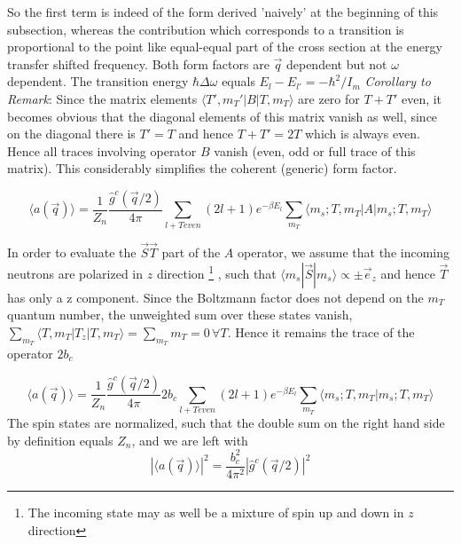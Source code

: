 \documentclass[11pt,a4paper]{article}
\begin{document}
So the first term is indeed of the form derived 'naively' at the beginning of this subsection, whereas the contribution which
corresponds to a transition is proportional to the point like equal-equal part of the cross section at the energy transfer shifted frequency.
Both form factors are $\vec q$ dependent but not $\omega$ dependent. The transition energy $\hbar \Delta \omega$ equals $E_l -E_{l'}
= -\hbar^2/I_m$ \newline
\textit{Corollary to Remark}: Since the matrix elements 
$\langle T', m_T' | B | T, m_T \rangle$ are zero for $T + T'$ even, it becomes obvious that the diagonal elements of this matrix
vanish as well, since on the diagonal there is $T' = T$ and hence $T + T' = 2T$ which is always even. Hence all traces involving operator $B$
vanish (even, odd or full trace of this matrix). This considerably simplifies the coherent (generic) form factor.

\begin{equation}
\langle a (\vec q ) \rangle = 
\frac{ 1 }{Z_n} \frac{ \hat g^c (\vec q /2)}{4 \pi }  \sum_{l + T even} (2l + 1)e^{-\beta E_l} 
\sum_{m_T}
\langle m_s; T, m_T | A | m_s; T, m_T \rangle
\end{equation}

In order to evaluate the $\vec S \vec T$ part of the $A$ operator, we assume that the incoming neutrons are polarized 
in $z$ direction \footnote{The incoming state may as well be a mixture of spin up and down in $z$ direction}
, such that $\langle m_s | \vec S | m_s \rangle \propto \pm \vec e_z$ and hence $\vec T$ has only a z component. Since the
Boltzmann factor does not depend on the $m_T$ quantum number, the unweighted sum over these states vanish, 
$\sum_{m_T} \langle  T, m_T | T_z | T, m_T \rangle = \sum_{m_T} m_T = 0 \, \forall T$. Hence it remains the trace of
the operator $2 b_c$

\begin{equation}
\langle a(\vec q ) \rangle = 
\frac{ 1 }{Z_n} \frac{ \hat g^c (\vec q /2)}{4 \pi } 2b_c \sum_{l + T even} (2l + 1)e^{-\beta E_l} 
\sum_{m_T}
\langle m_s; T, m_T | m_s; T, m_T \rangle
\end{equation}
The spin states are normalized, such that the double sum on the right hand side by definition equals $Z_n$, and we are left with
\begin{equation}
|\langle a(\vec q ) \rangle|^2 = 
\frac{ b_c^2}{4 \pi^2 }
|\hat g^c(\vec q /2)|^2 
\end{equation}
\end{document}
